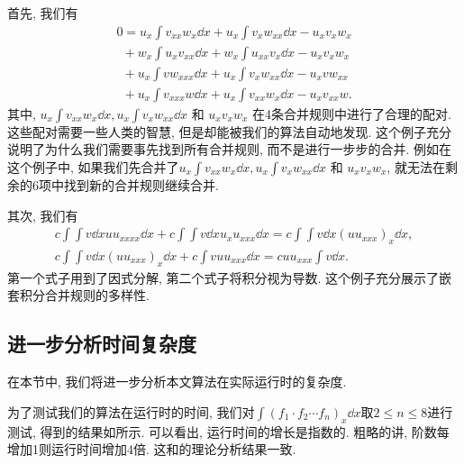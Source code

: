 首先, 我们有 
\begin{equation}
\renewcommand{\arraystretch}{1.0}
\begin{array}{l}
0=u_x\int\!{v_{xx}w_x\dd x}+u_x\int\!{v_xw_{xx}\dd x}-u_xv_xw_x\\
~~+w_x\int\!{u_xv_{xx}\dd x}+w_x\int\!{u_{xx}v_x\dd x}-u_xv_xw_x\\
~~+u_x\int\!{vw_{xxx}\dd x}+u_x\int\!{v_xw_{xx}\dd x}-u_xvw_{xx}\\
~~+u_x\int\!{v_{xxx}w\dd x}+u_x\int\!{v_{xx}w_x\dd x}-u_xv_{xx}w.
\end{array}
\label{counter_example}
\end{equation}
其中, $u_x\int\!{v_{xx}w_x\dd x},u_x\int\!{v_xw_{xx}\dd x}$ 和 $u_xv_xw_x$ 在4条合并规则中进行了合理的配对. 这些配对需要一些人类的智慧, 但是却能被我们的算法自动地发现. 这个例子充分说明了为什么我们需要事先找到所有合并规则, 而不是进行一步步的合并. 例如在这个例子中, 如果我们先合并了$u_x\int\!{v_{xx}w_x\dd x},u_x\int\!{v_xw_{xx}\dd x}$ 和 $u_xv_xw_x$, 就无法在剩余的6项中找到新的合并规则继续合并. 

其次, 我们有 
\begin{equation}
\renewcommand{\arraystretch}{1.2}
\begin{array}{c}
c\int\!{\int\!{v\dd x}uu_{xxxx}\dd x}+c\int\!{\int\!{v\dd x}u_xu_{xxx}\dd x}=c\int\!{\int\!{v\dd x}(uu_{xxx})_x\dd x},\\
c\int\!{\int\!{v\dd x}(uu_{xxx})_x\dd x}+c\int\!{vuu_{xxx}\dd x}=cuu_{xxx}\int\!{v\dd x}.
\end{array}
\end{equation} 
第一个式子用到了因式分解, 第二个式子将积分视为导数. 这个例子充分展示了嵌套积分合并规则的多样性. 

\subsection{进一步分析时间复杂度}\label{sec5.2-03}
在本节中, 我们将进一步分析本文算法在实际运行时的复杂度. 

为了测试我们的算法在运行时的时间, 我们对$\int\!{(f_1\cdot f_2\cdots f_n)_x \dd x}$取$2\le n \le 8$进行测试, 得到的结果如所示. 可以看出, 运行时间的增长是指数的. 粗略的讲, 阶数每增加1则运行时间增加4倍. 这和的理论分析结果一致. 

